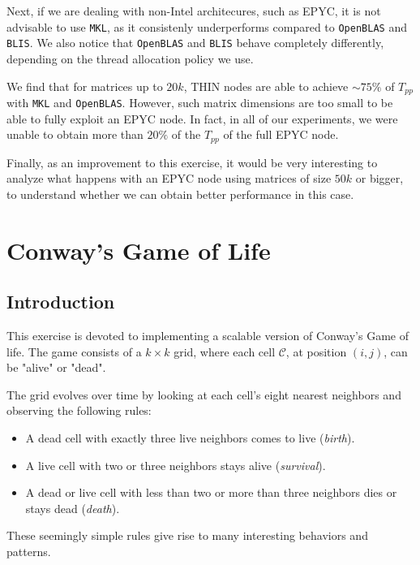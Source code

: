 \documentclass{report}
\begin{document}
Next, if we are dealing with non-Intel architecures, such as EPYC, it is not 
advisable to use \texttt{MKL}, as it consistenly underperforms compared to 
\texttt{OpenBLAS} and \texttt{BLIS}. We also notice that \texttt{OpenBLAS} and 
\texttt{BLIS} behave completely differently, depending on the thread allocation
policy we use.

We find that for matrices up to $20k$, THIN nodes are able to achieve 
$\sim 75\%$ of $T_{pp}$ with \texttt{MKL} and \texttt{OpenBLAS}. However, 
such matrix dimensions are too small to be able to fully exploit an EPYC node. 
In fact, in all of our experiments, we were unable to obtain 
more than $20\%$ of the $T_{pp}$ of the full EPYC node.

Finally, as an improvement to this exercise, it would be very interesting to 
analyze what happens with an EPYC node using matrices of size $50k$ or bigger, 
to understand whether we can obtain better performance in this case.

\chapter{Conway's Game of Life}


\section{Introduction}

This exercise is devoted to implementing a scalable version of Conway's Game of 
life\cite{conway}. The game consists of a $k\times k$ grid, where each cell 
$\mathcal{C}$, at position $(i,j)$, can be "alive" or "dead".

The grid evolves over time by looking at each cell's  eight nearest 
neighbors and observing the following rules: 

\begin{itemize}
    \item A dead cell with exactly three live neighbors comes to live (\textit{birth}).
    \item A live cell with two or three neighbors stays alive (\textit{survival}).
    \item A dead or live cell with less than two or more than three neighbors dies 
        or stays dead (\textit{death}).
\end{itemize}

These seemingly simple rules give rise to many interesting behaviors and 
patterns\cite{conway_patterns}. 
\end{document}
